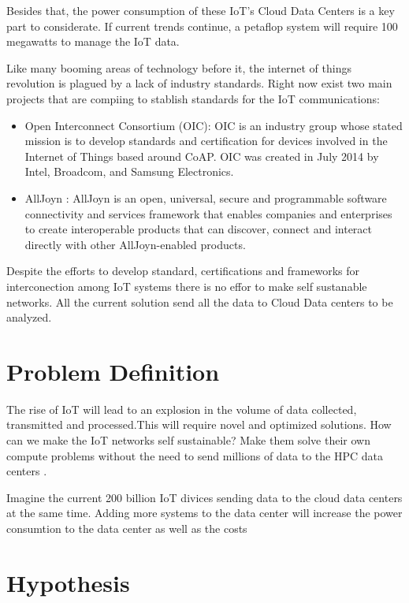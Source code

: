 Besides that, the power consumption of these  IoT’s Cloud Data Centers is a key
part to considerate. If current trends continue, a petaflop system will require 
100 megawatts to manage the IoT data. 

Like many booming areas of technology before it, the internet of things
revolution is plagued by a lack of industry standards. Right now exist two main 
projects that are compiing to stablish standards for the IoT communications: 

\begin{itemize}
\item Open Interconnect Consortium (OIC): OIC is an industry group whose stated 
mission is to develop standards and certification for devices involved in the 
Internet of Things based around CoAP. OIC was created in July 2014 by Intel, 
Broadcom, and Samsung Electronics.
\item AllJoyn : AllJoyn is an open, universal, secure and programmable software 
connectivity and services framework that enables companies and enterprises to 
create interoperable products that can discover, connect and interact directly 
with other AllJoyn-enabled products.
\end{itemize}

Despite the efforts to develop standard, certifications and frameworks for 
interconection among IoT systems there is no effor to make self sustanable 
networks. All the current solution send all the data to Cloud Data centers to be 
analyzed. 

\section{Problem Definition}
\noindent

The rise of IoT will lead to an explosion in the volume of data collected, 
transmitted and processed.This will require novel and optimized solutions. 
How can we make the IoT networks self sustainable? Make them solve their own compute problems 
without the need to send millions of data to the HPC data centers . 

Imagine the current 200 billion IoT divices sending data to the cloud data 
centers at the same time. Adding more systems to the data center will increase 
the power consumtion to the data center as well as the costs


\section{Hypothesis}
\noindent

